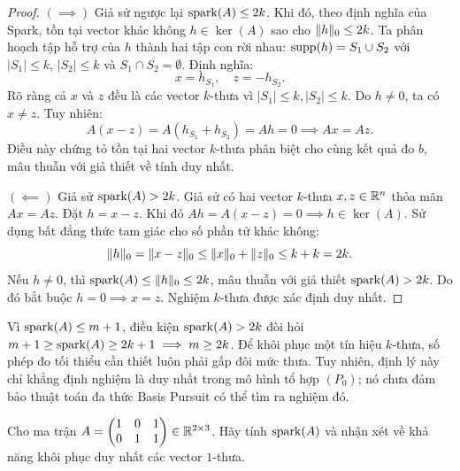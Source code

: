 \begin{proof}
$(\implies)$ Giả sử ngược lại $\operatorname{spark}(A) \le 2k$. Khi đó, theo định nghĩa của Spark, tồn tại vector khác không $h \in \ker(A)$ sao cho $\|h\|_0 \le 2k$. Ta phân hoạch tập hỗ trợ của $h$ thành hai tập con rời nhau: $\operatorname{supp}(h) = S_1 \cup S_2$ với $|S_1| \le k$, $|S_2| \le k$ và $S_1 \cap S_2 = \emptyset$. Định nghĩa:
\[
x = h_{S_1}, \quad z = -h_{S_2}.
\]
Rõ ràng cả $x$ và $z$ đều là các vector $k$-thưa vì $|S_1| \le k, |S_2| \le k$. Do $h \ne 0$, ta có $x \ne z$. Tuy nhiên:
\[
A(x - z) = A(h_{S_1} + h_{S_2}) = Ah = 0 \implies Ax = Az.
\]
Điều này chứng tỏ tồn tại hai vector $k$-thưa phân biệt cho cùng kết quả đo $b$, mâu thuẫn với giả thiết về tính duy nhất.

$(\impliedby)$ Giả sử $\operatorname{spark}(A) > 2k$. Giả sử có hai vector $k$-thưa $x, z \in \mathbb{R}^n$ thỏa mãn $Ax = Az$. Đặt $h = x - z$. Khi đó $Ah = A(x - z) = 0 \implies h \in \ker(A)$. Sử dụng bất đẳng thức tam giác cho số phần tử khác không:
\[
\|h\|_0 = \|x - z\|_0 \le \|x\|_0 + \|z\|_0 \le k + k = 2k.
\]
Nếu $h \ne 0$, thì $\operatorname{spark}(A) \le \|h\|_0 \le 2k$, mâu thuẫn với giả thiết $\operatorname{spark}(A) > 2k$. Do đó bắt buộc $h = 0 \implies x = z$. Nghiệm $k$-thưa được xác định duy nhất.
\end{proof}

\begin{remark}
Vì $\operatorname{spark}(A) \le m + 1$, điều kiện $\operatorname{spark}(A) > 2k$ đòi hỏi $m + 1 \ge \operatorname{spark}(A) \ge 2k + 1 \implies m \ge 2k$. Để khôi phục một tín hiệu $k$-thưa, số phép đo tối thiểu cần thiết luôn phải gấp đôi mức thưa. Tuy nhiên, định lý này chỉ khẳng định nghiệm là duy nhất trong mô hình tổ hợp $(P_0)$; nó chưa đảm bảo thuật toán đa thức Basis Pursuit có thể tìm ra nghiệm đó.
\end{remark}

\begin{exercise}
Cho ma trận $A = \begin{pmatrix} 1 & 0 & 1 \\ 0 & 1 & 1 \end{pmatrix} \in \mathbb{R}^{2 \times 3}$. Hãy tính $\operatorname{spark}(A)$ và nhận xét về khả năng khôi phục duy nhất các vector $1$-thưa.
\end{exercise}

